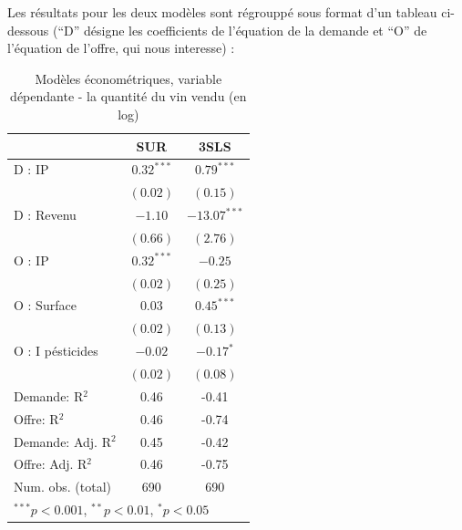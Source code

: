 \documentclass[11pt,]{article}
\begin{document}
Les résultats pour les deux modèles sont régrouppé sous format d'un
tableau ci-dessous (``D'' désigne les coefficients de l'équation de la
demande et ``O'' de l'équation de l'offre, qui nous interesse) :

\FloatBarrier

\begin{table}[!htbp]
\begin{center}
\begin{tabular}{l c c }
\hline
 & SUR & 3SLS \\
\hline
D : IP              & $0.32^{***}$ & $0.79^{***}$   \\
                    & $(0.02)$     & $(0.15)$       \\
D : Revenu          & $-1.10$      & $-13.07^{***}$ \\
                    & $(0.66)$     & $(2.76)$       \\
O : IP              & $0.32^{***}$ & $-0.25$        \\
                    & $(0.02)$     & $(0.25)$       \\
O : Surface         & $0.03$       & $0.45^{***}$   \\
                    & $(0.02)$     & $(0.13)$       \\
O : I pésticides    & $-0.02$      & $-0.17^{*}$    \\
                    & $(0.02)$     & $(0.08)$       \\
\hline
Demande: R$^2$      & 0.46         & -0.41          \\
Offre: R$^2$        & 0.46         & -0.74          \\
Demande: Adj. R$^2$ & 0.45         & -0.42          \\
Offre: Adj. R$^2$   & 0.46         & -0.75          \\
Num. obs. (total)   & 690          & 690            \\
\hline
\multicolumn{3}{l}{\scriptsize{$^{***}p<0.001$, $^{**}p<0.01$, $^*p<0.05$}}
\end{tabular}
\caption{Modèles économétriques, variable dépendante - la quantité du vin vendu (en log)}
\label{table : sur et 3sls}
\end{center}
\end{table}

\FloatBarrier
\end{document}

